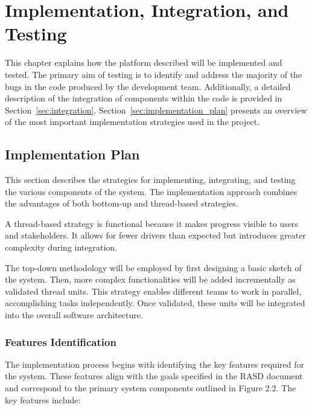 \chapter{Implementation, Integration, and Testing}

This chapter explains how the platform described will be implemented and tested. The primary aim of testing is to identify and address the majority of the bugs in the code produced by the development team. Additionally, a detailed description of the integration of components within the code is provided in Section~\ref{sec:integration}. Section~\ref{sec:implementation_plan} presents an overview of the most important implementation strategies used in the project.

\section{Implementation Plan\label{sec:implementation_plan}}

This section describes the strategies for implementing, integrating, and testing the various components of the system. The implementation approach combines the advantages of both bottom-up and thread-based strategies.

A thread-based strategy is functional because it makes progress visible to users and stakeholders. It allows for fewer drivers than expected but introduces greater complexity during integration. 

The top-down methodology will be employed by first designing a basic sketch of the system. Then, more complex functionalities will be added incrementally as validated thread units. This strategy enables different teams to work in parallel, accomplishing tasks independently. Once validated, these units will be integrated into the overall software architecture.

\pagebreak
\subsection{Features Identification\label{sec:features_identification}}

The implementation process begins with identifying the key features required for the system. These features align with the goals specified in the RASD document and correspond to the primary system components outlined in Figure 2.2. The key features include:

